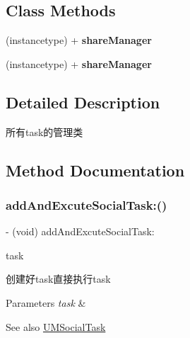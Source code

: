 \subsection*{Class Methods}
\begin{DoxyCompactItemize}
\item 
\mbox{\label{interface_u_m_social_task_manager_a85df92e6209d1df194086efcb746e704}} 
(instancetype) + {\bfseries share\+Manager}
\item 
\mbox{\label{interface_u_m_social_task_manager_a85df92e6209d1df194086efcb746e704}} 
(instancetype) + {\bfseries share\+Manager}
\end{DoxyCompactItemize}


\subsection{Detailed Description}
所有task的管理类 

\subsection{Method Documentation}
\mbox{\label{interface_u_m_social_task_manager_ae418b6523f6d17a36844d3942522718e}} 
\subsubsection{\texorpdfstring{add\+And\+Excute\+Social\+Task\+:()}{addAndExcuteSocialTask:()}\hspace{0.1cm}{\footnotesize\ttfamily [1/2]}}
{\footnotesize\ttfamily -\/ (void) add\+And\+Excute\+Social\+Task\+: \begin{DoxyParamCaption}\item[{(\mbox{\hyperlink{interface_u_m_social_task}{U\+M\+Social\+Task}} $\ast$)}]{task }\end{DoxyParamCaption}}

创建好task直接执行task


\begin{DoxyParams}{Parameters}
{\em task} & \\
\hline
\end{DoxyParams}
\begin{DoxySeeAlso}{See also}
\mbox{\hyperlink{interface_u_m_social_task}{U\+M\+Social\+Task}} 
\end{DoxySeeAlso}
\mbox{\label{interface_u_m_social_task_manager_ae418b6523f6d17a36844d3942522718e}} 
